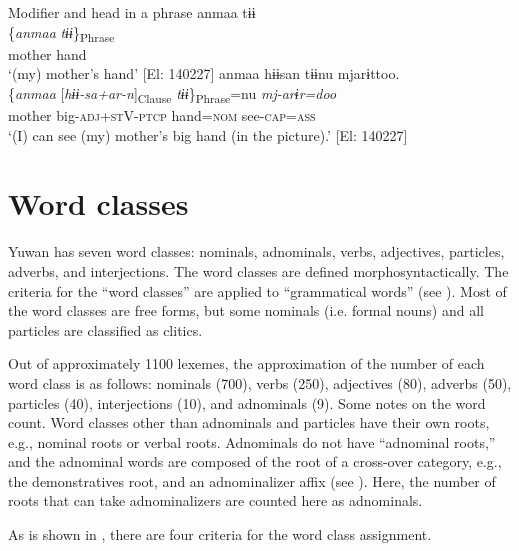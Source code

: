 \ea  Modifier and head in a phrase \label{ex:4.47}
\ea  %
\glll    anmaa  tɨɨ  \\
      \{\textit{anmaa}  \textit{tɨɨ}\}\textsubscript{Phrase}  \\
      mother  hand  \\
    \glt       ‘(my) mother’s hand’ [El: 140227]
\ex\label{ex:4.47b}
\glll   anmaa  hɨɨsan  tɨɨnu  mjarɨttoo.\\
      \{\textit{anmaa}  [\textit{hɨɨ-sa+ar-n}]\textsubscript{Clause} \textit{tɨɨ}\}\textsubscript{Phrase}=nu  \textit{mj-arɨr=doo}\\
      mother  big-\textsc{adj}+\textsc{st}V-\textsc{ptcp}  hand=\textsc{nom}  see-\textsc{cap}=\textsc{ass}\\
    \glt       ‘(I) can see (my) mother’s big hand (in the picture).’ [El: 140227]
    \z
\z

\section{Word classes}\label{sec:4.3}

Yuwan has seven word classes: nominals, adnominals, verbs, adjectives, particles, adverbs, and interjections. The word classes are defined morphosyntactically. The criteria for the “word classes” are applied to “grammatical words” (see ). Most of the word classes are free forms, but some nominals (i.e. formal nouns) and all particles are classified as clitics.

Out of approximately 1100 lexemes, the approximation of the number of each word class is as follows: nominals (700), verbs (250), adjectives (80), adverbs (50), particles (40), interjections (10), and adnominals (9). Some notes on the word count. Word classes other than adnominals and particles have their own roots, e.g., nominal roots or verbal roots. Adnominals do not have “adnominal roots,” and the adnominal words are composed of the root of a cross-over category, e.g., the demonstratives root, and an adnominalizer affix (see ). Here, the number of roots that can take adnominalizers are counted here as adnominals.

As is shown in , there are four criteria for the word class assignment.

